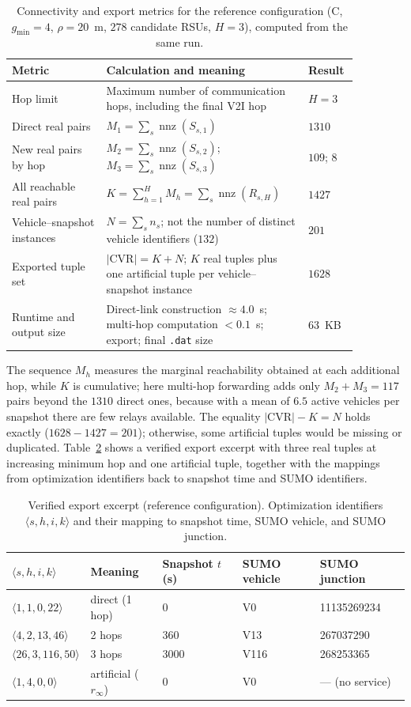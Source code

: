 \documentclass[engproc,proceedingpaper,submit,oneauthor]{Definitions/mdpi}
\newcommand{\nnz}{\operatorname{nnz}}
\newcommand{\CVR}{\mathrm{CVR}}
\begin{document}
\begin{table}[H]
\centering
\caption{Connectivity and export metrics for the reference configuration
(C, $g_{\min}=4$, $\rho=20$~m, $278$ candidate RSUs, $H=3$), computed from the same
run.}\label{tab:multihop-cvr}
\footnotesize
\begin{tabular}{p{0.25\linewidth}p{0.52\linewidth}p{0.10\linewidth}}
\toprule
Metric & Calculation and meaning & Result\\
\midrule
Hop limit & Maximum number of communication hops, including the final V2I hop & $H=3$\\
Direct real pairs & $M_1=\sum_s\nnz(S_{s,1})$ & $1310$\\
New real pairs by hop & $M_2=\sum_s\nnz(S_{s,2})$; \; $M_3=\sum_s\nnz(S_{s,3})$ &
$109$; $8$\\
All reachable real pairs & $K=\sum_{h=1}^{H}M_h=\sum_s\nnz(R_{s,H})$ & $1427$\\
Vehicle--snapshot instances & $N=\sum_s n_s$; not the number of distinct vehicle
identifiers ($132$) & $201$\\
Exported tuple set & $|\CVR|=K+N$; $K$ real tuples plus one artificial tuple per
vehicle--snapshot instance & $1628$\\
Runtime and output size & Direct-link construction $\approx4.0$~s; multi-hop
computation $<0.1$~s; export; final \texttt{.dat} size & $63$~KB\\
\bottomrule
\end{tabular}
\end{table}

The sequence $M_h$ measures the marginal reachability obtained at each additional hop,
while $K$ is cumulative; here multi-hop forwarding adds only $M_2+M_3=117$ pairs beyond
the $1310$ direct ones, because with a mean of $6.5$ active vehicles per snapshot there
are few relays available. The equality $|\CVR|-K=N$ holds exactly ($1628-1427=201$);
otherwise, some artificial tuples would be missing or duplicated. Table~\ref{tab:excerpt}
shows a verified export excerpt with three real tuples at increasing minimum hop and one
artificial tuple, together with the mappings from optimization identifiers back to
snapshot time and SUMO identifiers.

\begin{table}[H]
\centering
\caption{Verified export excerpt (reference configuration). Optimization identifiers
$\langle s,h,i,k\rangle$ and their mapping to snapshot time, SUMO vehicle, and SUMO
junction.}\label{tab:excerpt}
\small
\begin{tabular}{lllll}
\toprule
$\langle s,h,i,k\rangle$ & Meaning & Snapshot $t$ (s) & SUMO vehicle & SUMO junction\\
\midrule
$\langle 1,1,0,22\rangle$ & direct (1 hop) & $0$ & V0 & 11135269234\\
$\langle 4,2,13,46\rangle$ & 2 hops & $360$ & V13 & 267037290\\
$\langle 26,3,116,50\rangle$ & 3 hops & $3000$ & V116 & 268253365\\
$\langle 1,4,0,0\rangle$ & artificial ($r_\infty$) & $0$ & V0 & --- (no service)\\
\bottomrule
\end{tabular}
\end{table}
\end{document}
